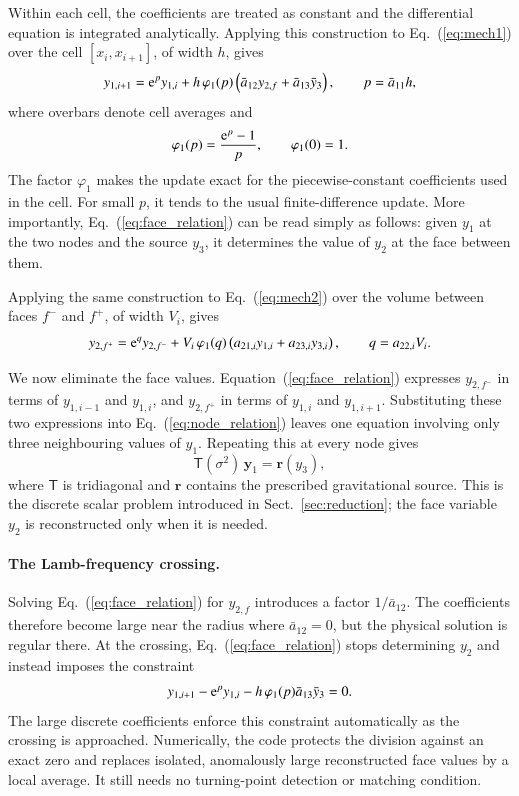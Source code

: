 \documentclass[]{aa}
\begin{document}
Within each cell, the coefficients are treated as constant and the differential equation is integrated analytically. Applying this construction to Eq.~(\ref{eq:mech1}) over the cell $[x_i,x_{i+1}]$, of width $h$, gives
\begin{equation}
y_{1,i+1}
={\rm e}^{p}y_{1,i}
+h\,\varphi_1(p)
\left(
\bar a_{12}y_{2,f}
+\bar a_{13}\bar y_3
\right),
\qquad
p=\bar a_{11}h ,
\label{eq:face_relation}
\end{equation}
where overbars denote cell averages and
\[
\varphi_1(p)=\frac{{\rm e}^{p}-1}{p},
\qquad
\varphi_1(0)=1 .
\]
The factor $\varphi_1$ makes the update exact for the piecewise-constant coefficients used in the cell. For small $p$, it tends to the usual finite-difference update. More importantly, Eq.~(\ref{eq:face_relation}) can be read simply as follows: given $y_1$ at the two nodes and the source $y_3$, it determines the value of $y_2$ at the face between them.

Applying the same construction to Eq.~(\ref{eq:mech2}) over the volume between faces $f^-$ and $f^+$, of width $V_i$, gives
\begin{equation}
y_{2,f^+}
={\rm e}^{q}y_{2,f^-}
+V_i\,\varphi_1(q)
\left(
a_{21,i}y_{1,i}+a_{23,i}y_{3,i}
\right),
\qquad
q=a_{22,i}V_i .
\label{eq:node_relation}
\end{equation}

We now eliminate the face values. Equation~(\ref{eq:face_relation}) expresses $y_{2,f^-}$ in terms of $y_{1,i-1}$ and $y_{1,i}$, and $y_{2,f^+}$ in terms of $y_{1,i}$ and $y_{1,i+1}$. Substituting these two expressions into Eq.~(\ref{eq:node_relation}) leaves one equation involving only three neighbouring values of $y_1$. Repeating this at every node gives
\begin{equation}
\mathsf{T}(\sigma^2)\,\mathbf{y}_1
=\mathbf{r}(y_3),
\end{equation}
where $\mathsf{T}$ is tridiagonal and $\mathbf{r}$ contains the prescribed gravitational source. This is the discrete scalar problem introduced in Sect.~\ref{sec:reduction}; the face variable $y_2$ is reconstructed only when it is needed.

\paragraph{The Lamb-frequency crossing.}
Solving Eq.~(\ref{eq:face_relation}) for $y_{2,f}$ introduces a factor $1/\bar a_{12}$. The coefficients therefore become large near the radius where $\bar a_{12}=0$, but the physical solution is regular there. At the crossing, Eq.~(\ref{eq:face_relation}) stops determining $y_2$ and instead imposes the constraint
\[
y_{1,i+1}
-{\rm e}^{p}y_{1,i}
-h\,\varphi_1(p)\bar a_{13}\bar y_3
=0 .
\]
The large discrete coefficients enforce this constraint automatically as the crossing is approached. Numerically, the code protects the division against an exact zero and replaces isolated, anomalously large reconstructed face values by a local average. It still needs no turning-point detection or matching condition.
\end{document}
